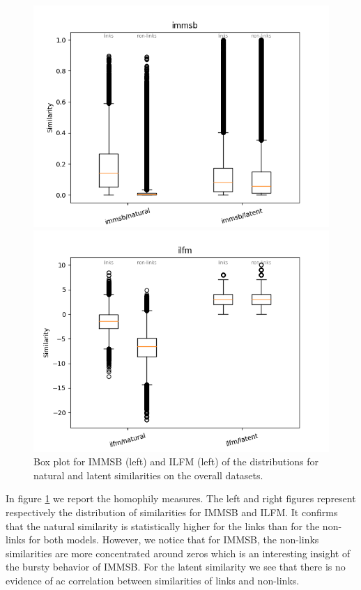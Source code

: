 \begin{figure}[h]
    \centering
        \begin{minipage}{0.24\textwidth}
            \includegraphics[width=\textwidth]{img/corpus/homo_mustach_immsb}
        \end{minipage}
        \begin{minipage}{0.24\textwidth}
            \includegraphics[width=\textwidth]{img/corpus/homo_mustach_ilfm}
        \end{minipage}
        \caption{Box plot for IMMSB (left) and ILFM (left) of the distributions for natural and latent similarities on the overall datasets. }
        \label{fig:homo_mustach}
\end{figure}

In figure \ref{fig:homo_mustach} we report the homophily measures. The left and right figures represent respectively the distribution of similarities for IMMSB and ILFM. It confirms that the natural similarity is statistically higher for the links than for the non-links for both models. However, we notice that for IMMSB, the non-links similarities are more concentrated around zeros which is an interesting insight of the bursty behavior of IMMSB. For the latent similarity we see that there is no evidence of ac correlation between similarities of links and non-links.


